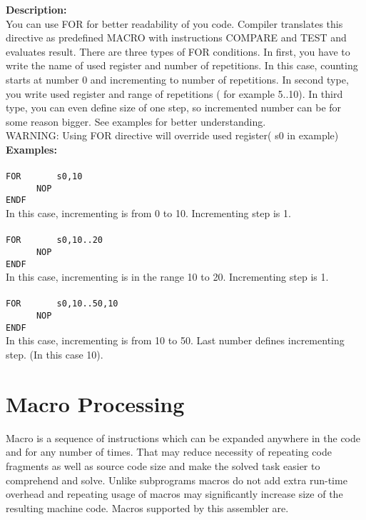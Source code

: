             \textbf{Description:}\\
            You can use FOR for better readability of you code. Compiler translates this directive as predefined MACRO with instructions COMPARE and TEST and
            evaluates result. There are three types of FOR conditions. In first, you have to write the name of used register and number of repetitions. In this case,
            counting starts at number 0 and incrementing to number of repetitions. In second type, you write used register and range of
            repetitions ( for example 5..10). In third type, you can even define size of one step, so incremented number can be for some reason bigger.
            See examples for better understanding.\\ WARNING: Using FOR directive will override used register( s0 in example)
            \textbf{Examples:}\\
        {
            ~\\
            \usecodefont
            \verb'FOR       s0,10'\\
            \verb'      NOP'\\
            \verb'ENDF'
        }\\
        In this case, incrementing is from 0 to 10. Incrementing step is 1.\\
        {
            ~\\
            \usecodefont
            \verb'FOR       s0,10..20'\\
            \verb'      NOP'\\
            \verb'ENDF'
        }\\

        In this case, incrementing is in the range 10 to 20. Incrementing step is 1.\\
        {
            ~\\
            \usecodefont
            \verb'FOR       s0,10..50,10'\\
            \verb'      NOP'\\
            \verb'ENDF'
        }\\
        In this case, incrementing is from 10 to 50. Last number defines incrementing step. (In this case 10).\\

    \section{Macro Processing}
        Macro is a sequence of instructions which can be expanded anywhere in the code and for any number of times. That may reduce necessity of
        repeating code fragments as well as source code size and make the solved task easier to comprehend and solve. Unlike subprograms macros do
        not add extra run-time overhead and repeating usage of macros may significantly increase size of the resulting machine code. Macros supported
        by this assembler are.

